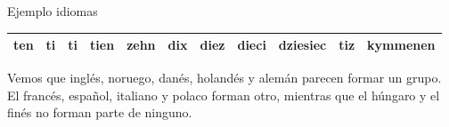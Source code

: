 \documentclass[spanish]{beamer}
\begin{document}
\begin{frame}{Ejemplo idiomas}
\begin{table}[h]
{\begin{tabular}{lllllllllll}
ten                                                  & ti                                                    & ti                                                   & tien                                                    & zehn                                                 & dix                                                    & diez                                                   & dieci                                                  & dziesiec                                             & tiz                                                   & kymmenen                                             \\ \bottomrule
\end{tabular}
}
\end{table}
\end{frame}

\begin{frame}{}
Vemos que inglés, noruego, danés, holandés y alemán parecen formar un grupo. El francés, español, italiano y polaco forman otro, mientras que el húngaro y el finés no forman parte de ninguno.
\begin{table}[h]
\centering
{}
\end{table}
\end{frame}
\end{document}
